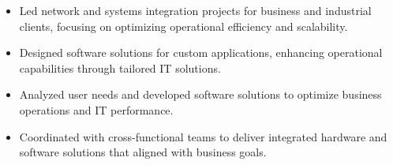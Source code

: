 \par\smallskip
\noindent
\begin{minipage}{20cm}
  \begin{minipage}{9.75cm}
    \begin{itemize}
      \item Led network and systems integration projects for business and industrial clients, focusing on optimizing operational efficiency and scalability.
      \item Designed software solutions for custom applications, enhancing operational capabilities through tailored IT solutions.
    \end{itemize}
  \end{minipage}
  \hfill
  \begin{minipage}{9.75cm}
    \begin{itemize}
      \item Analyzed user needs and developed software solutions to optimize business operations and IT performance.
      \item Coordinated with cross-functional teams to deliver integrated hardware and software solutions that aligned with business goals.
    \end{itemize}
  \end{minipage}
\end{minipage}
\par\smallskip
\divider

